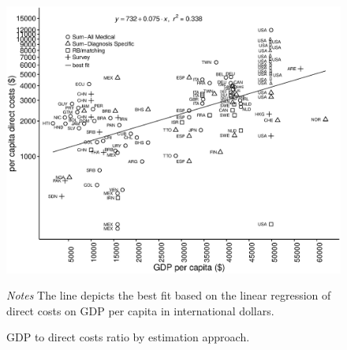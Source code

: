 \begin{figure}[p]
\caption{\label{fig:review_GDPtocost_ratio}\acs*{GDP} to direct costs ratio by estimation approach.}%
\begin{minipage}{\linewidth}
\begin{center}
\includegraphics[width=1\linewidth]{Review/Figures/Fig3.eps}\\
\end{center}
\footnotesize
\textit{Notes}  The line depicts the best fit based on the linear regression of direct costs on \ac{GDP} per capita in international dollars.
\end{minipage}
\end{figure}





